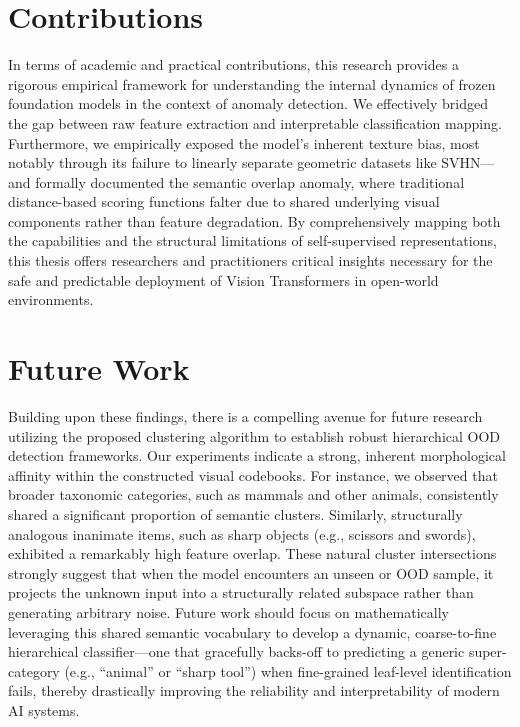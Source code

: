 \documentclass[oneside]{ctuthesis}
\begin{document}
\section{Contributions}
\label{sec:contributions}
In terms of academic and practical contributions, this research provides a rigorous empirical framework for understanding the internal dynamics of frozen foundation models in the context of anomaly detection. We effectively bridged the gap between raw feature extraction and interpretable classification mapping. Furthermore, we empirically exposed the model's inherent texture bias, most notably through its failure to linearly separate geometric datasets like SVHN—and formally documented the semantic overlap anomaly, where traditional distance-based scoring functions falter due to shared underlying visual components rather than feature degradation. By comprehensively mapping both the capabilities and the structural limitations of self-supervised representations, this thesis offers researchers and practitioners critical insights necessary for the safe and predictable deployment of Vision Transformers in open-world environments.

\section{Future Work}
\label{sec:future_work}
Building upon these findings, there is a compelling avenue for future research utilizing the proposed clustering algorithm to establish robust hierarchical OOD detection frameworks. Our experiments indicate a strong, inherent morphological affinity within the constructed visual codebooks. For instance, we observed that broader taxonomic categories, such as mammals and other animals, consistently shared a significant proportion of semantic clusters. Similarly, structurally analogous inanimate items, such as sharp objects (e.g., scissors and swords), exhibited a remarkably high feature overlap. These natural cluster intersections strongly suggest that when the model encounters an unseen or OOD sample, it projects the unknown input into a structurally related subspace rather than generating arbitrary noise. Future work should focus on mathematically leveraging this shared semantic vocabulary to develop a dynamic, coarse-to-fine hierarchical classifier—one that gracefully backs-off to predicting a generic super-category (e.g., ``animal'' or ``sharp tool'') when fine-grained leaf-level identification fails, thereby drastically improving the reliability and interpretability of modern AI systems.
\end{document}

